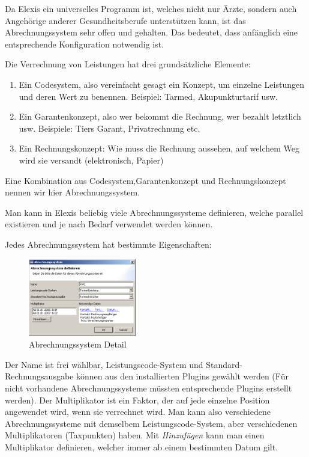 Da Elexis ein universelles Programm ist, welches nicht nur Ärzte, sondern auch Angehörige anderer Gesundheitsberufe unterstützen kann, ist das Abrechnungssystem sehr offen und gehalten. Das bedeutet, dass anfänglich eine entsprechende Konfiguration notwendig ist.

Die Verrechnung von Leistungen hat drei grundsätzliche Elemente:
\begin{enumerate}
    \item Ein Codesystem, also vereinfacht gesagt ein Konzept, um einzelne Leistungen und deren Wert zu benennen. Beispiel: \glqq Tarmed\grqq{}, \glqq Akupunkturtarif\grqq{} usw.
   \item Ein Garantenkonzept, also wer bekommt die Rechnung, wer bezahlt letztlich usw. Beispiele: Tiers Garant, Privatrechnung etc.
   \item Ein Rechnungskonzept: Wie muss die Rechnung aussehen, auf welchem Weg wird sie versandt (elektronisch, Papier)
\end{enumerate}

Eine Kombination aus Codesystem,Garantenkonzept und Rechnungskonzept nennen wir hier \glqq Abrechnungssystem\grqq{}.

Man kann in Elexis beliebig viele Abrechnungssysteme definieren, welche parallel existieren und je nach Bedarf verwendet werden können. 

Jedes Abrechnungssystem hat bestimmte Eigenschaften:
\begin{figure}
    \includegraphics[width=4.7cm]{images/abrechnungssystem1}
    \caption{Abrechnungssystem Detail}
    \label{fig:abr1}
\end{figure}

Der Name ist frei wählbar, Leistungscode-System und Standard-Rechnungsausgabe können aus den installierten Plugins gewählt werden (Für nicht vorhandene Abrechnungssysteme müssten entsprechende Plugins erstellt werden).
Der Multiplikator ist ein Faktor, der auf jede einzelne Position angewendet wird, wenn sie verrechnet wird. Man kann also verschiedene Abrechnungssysteme mit demselbem Leistungscode-System, aber verschiedenen Multiplikatoren (\glqq Taxpunkten\grqq{}) haben. Mit \textit{Hinzufügen} kann man einen Multiplikator definieren, welcher immer ab einem bestimmten Datum gilt.

